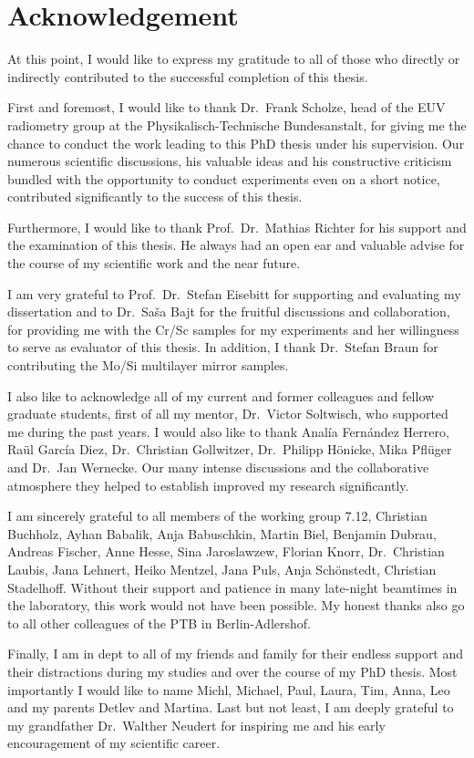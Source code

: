 \pagestyle{empty}
\noindent
\section*{Acknowledgement}
At this point, I would like to express my gratitude to all of those who directly or indirectly contributed to the successful completion of this thesis.

First and foremost, I would like to thank Dr.~Frank Scholze, head of the EUV radiometry group at the Physikalisch-Technische Bundesanstalt, for giving me the chance to conduct the work leading to this PhD thesis under his supervision. Our numerous scientific discussions, his valuable ideas and his constructive criticism bundled with the opportunity to conduct experiments even on a short notice, contributed significantly to the success of this thesis.

Furthermore, I would like to thank Prof.~Dr.~Mathias Richter for his support and the examination of this thesis. He always had an open ear and valuable advise for the course of my scientific work and the near future. 

I am very grateful to Prof.~Dr.~Stefan Eisebitt for supporting and evaluating my dissertation and to Dr.~Sa\v{s}a Bajt for the fruitful discussions and collaboration, for providing me with the Cr/Sc samples for my experiments and her willingness to serve as evaluator of this thesis. In addition, I thank Dr.~Stefan Braun for contributing the Mo/Si multilayer mirror samples.

I also like to acknowledge all of my current and former colleagues and fellow graduate students, first of all my mentor, Dr.~Victor Soltwisch, who supported me during the past years. I would also like to thank Anal\'{i}a Fern\'{a}ndez Herrero, Raül Garc\'{i}a Diez, Dr.~Christian Gollwitzer, Dr.~Philipp Hönicke, Mika Pflüger and Dr.~Jan Wernecke. Our many intense discussions and the collaborative atmosphere they helped to establish improved my research significantly.

I am sincerely grateful to all members of the working group 7.12, Christian Buchholz, Ayhan Babalik, Anja Babuschkin, Martin Biel, Benjamin Dubrau, Andreas Fischer, Anne Hesse, Sina Jaroslawzew, Florian Knorr, Dr.~Christian Laubis, Jana Lehnert, Heiko Mentzel, Jana Puls, Anja Schönstedt, Christian Stadelhoff. Without their support and patience in many late-night beamtimes in the laboratory, this work would not have been possible. My honest thanks also go to all other colleagues of the PTB in Berlin-Adlershof.

Finally, I am in dept to all of my friends and family for their endless support and their distractions during my studies and over the course of my PhD thesis. Most importantly I would like to name Michl, Michael, Paul, Laura, Tim, Anna, Leo and my parents Detlev and Martina. Last but not least, I am deeply grateful to my grandfather Dr.~Walther Neudert for inspiring me and his early encouragement of my scientific career.








\cleardoublepage
